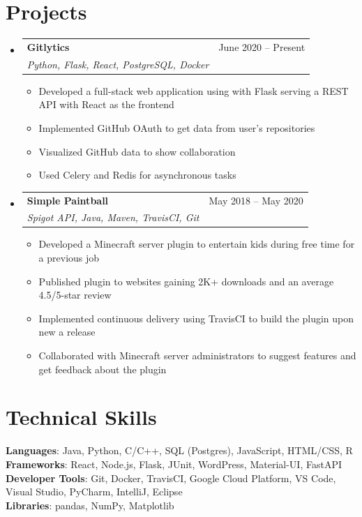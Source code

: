 \documentclass[letterpaper,11pt]{article}
\makeatletter
\newcommand{\resumeItem}[1]{
  \item\small{
    {#1 \vspace{-2pt}}
  }
}
\newcommand{\resumeSubheading}[4]{
  \vspace{-2pt}\item
    \begin{tabular*}{0.97\textwidth}[t]{l@{\extracolsep{\fill}}r}
      \textbf{#1} & #2 \\
      \textit{\small#3} & \textit{\small #4} \\
    \end{tabular*}\vspace{-7pt}
}
\newcommand{\resumeSubHeadingListStart}{\begin{itemize}[leftmargin=0.15in, label={}]}
\newcommand{\resumeSubHeadingListEnd}{\end{itemize}}
\newcommand{\resumeItemListStart}{\begin{itemize}}
\newcommand{\resumeItemListEnd}{\end{itemize}\vspace{-5pt}}
\makeatother
\begin{document}
    \section{Projects}
    \resumeSubHeadingListStart
                    \resumeSubheading
        {Gitlytics}{June 2020 -- Present}
        {Python, Flask, React, PostgreSQL, Docker}{}
                  \resumeItemListStart
                \resumeItem{Developed a full-stack web application using with Flask serving a REST API with React as the frontend}
                \resumeItem{Implemented GitHub OAuth to get data from user’s repositories}
                \resumeItem{Visualized GitHub data to show collaboration}
                \resumeItem{Used Celery and Redis for asynchronous tasks}
              \resumeItemListEnd
                              \resumeSubheading
        {Simple Paintball}{May 2018 -- May 2020}
        {Spigot API, Java, Maven, TravisCI, Git}{}
                  \resumeItemListStart
                \resumeItem{Developed a Minecraft server plugin to entertain kids during free time for a previous job}
                \resumeItem{Published plugin to websites gaining 2K+ downloads and an average 4.5/5-star review}
                \resumeItem{Implemented continuous delivery using TravisCI to build the plugin upon new a release}
                \resumeItem{Collaborated with Minecraft server administrators to suggest features and get feedback about the plugin}
              \resumeItemListEnd
                \resumeSubHeadingListEnd
    \section{Technical Skills}
      \begin{itemize}[leftmargin=0.15in, label={}]
    \small{\item{
                  \textbf{Languages}{: Java, Python, C/C++, SQL (Postgres), JavaScript, HTML/CSS, R} \\
                        \textbf{Frameworks}{: React, Node.js, Flask, JUnit, WordPress, Material-UI, FastAPI} \\
                        \textbf{Developer Tools}{: Git, Docker, TravisCI, Google Cloud Platform, VS Code, Visual Studio, PyCharm, IntelliJ, Eclipse} \\
                        \textbf{Libraries}{: pandas, NumPy, Matplotlib} \\
                }}
  \end{itemize}
  

\end{document}
